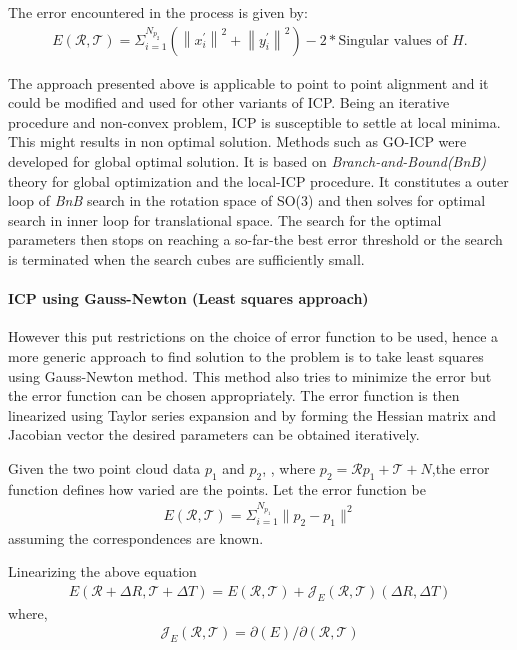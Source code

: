 The error encountered in the process is given by:
\begin{gather}  
E(\mathcal{R}, \mathcal{T}) = \Sigma_{i=1}^{N_{p_2}}(\left\lVert x_i^{'} \right\rVert^2 + \left\lVert y_i^{'} \right\rVert^2) - 2* \text{Singular values of } H.
\end{gather}

The approach presented above is applicable to point to point alignment and it could be modified and used for other variants of ICP. Being an iterative procedure and non-convex problem, ICP is susceptible to settle at local minima. This might results in non optimal solution. Methods such as GO-ICP \cite{Yang_2016} were developed for global optimal solution. It is based on \textit{Branch-and-Bound(BnB)} theory for global optimization and the local-ICP procedure. It constitutes a outer loop of \textit{BnB} search in the rotation space of SO(3) and then solves for optimal search in inner loop for translational space. The search for the optimal parameters then stops on reaching a so-far-the best error threshold or the search is terminated when the search cubes are sufficiently small. 
\par
\paragraph{ICP using Gauss-Newton (Least squares approach)}
However this put restrictions on the choice of error function to be used, hence a more generic approach to find solution to the problem is to take least squares using Gauss-Newton method. This method also tries to minimize the error but the error function can be chosen appropriately. The error function is then linearized using Taylor series expansion and by forming the Hessian matrix and Jacobian vector the desired parameters can be obtained iteratively. 
\par
Given the two point cloud data $p_1$ and $p_2$, , where $p_2 = \mathcal{R}p_1 + \mathcal{T} + N$,the error function defines how varied are the points.
Let the error function be
\begin{gather} 
    E(\mathcal{R}, \mathcal{T}) = \Sigma_{i=1}^{N_{p_1}}\lVert p_2 -  p_1 \rVert^2
\end{gather}
assuming the correspondences are known.
\par
Linearizing the above equation
\begin{gather} 
    E(\mathcal{R}+\Delta{R} , \mathcal{T}+ \Delta{T}) = E(\mathcal{R}, \mathcal{T}) + \mathcal{J}_E(\mathcal{R}, \mathcal{T})(\Delta{R} ,\Delta{T})
\end{gather}
where,
\begin{gather} 
    \mathcal{J}_E(\mathcal{R}, \mathcal{T}) = \partial (E) / \partial (\mathcal{R}, \mathcal{T})
\end{gather}

